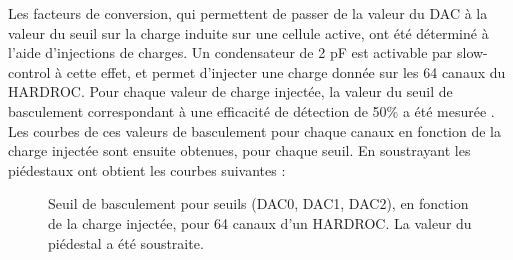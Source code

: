Les facteurs de conversion, qui permettent de passer de la valeur du DAC à la valeur du seuil sur la charge induite sur une cellule active, ont été déterminé à l'aide d'injections de charges. Un condensateur de 2 pF est activable par slow-control à cette effet, et permet d'injecter une charge donnée sur les 64 canaux du HARDROC. Pour chaque valeur de charge injectée, la valeur du seuil de basculement correspondant à une efficacité de détection de 50\% a été mesurée \cite{kieffer:tel-00751999}. Les courbes de ces valeurs de basculement pour chaque canaux en fonction de la charge injectée sont ensuite obtenues, pour chaque seuil. En soustrayant les piédestaux ont obtient les courbes suivantes :

\begin{figure}[ht!]
	\centering
	\hfill
	\hfill
	\caption{Seuil de basculement pour seuils (DAC0, DAC1, DAC2), en fonction de la charge injectée, pour 64 canaux d'un HARDROC. La valeur du piédestal a été soustraite.}
	\label{seuils}
\end{figure}

